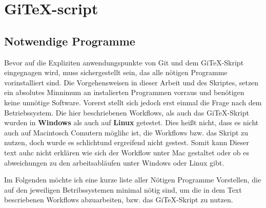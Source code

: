 \documentclass[12pt,a4paper]{scrartcl}
\begin{document}
\section{GiTeX-script}
\subsection{Notwendige Programme}
Bevor auf die Expliziten anwendungspunkte von Git und dem GiTeX-Skript eingegnagen wird, muss sichergestellt sein, das alle nötigen Programme vorinstalliert sind. Die Vorgehensweisen in dieser Arbeit und des Skriptes, setzen ein absolutes Minnimum an instalierten Programmen vorraus und benötigen keine unnötige Software. Vorerst stellt sich jedoch erst einmal die Frage nach dem Betriebssystem. Die hier beschriebenen Workflows, als auch das GiTeX-Skript wurden in \textbf{Windows} als auch auf \textbf{Linux} getestet. Dies heißt nicht, dass es nicht auch auf Macintosch Comutern möglihc ist, die Workflows bzw. das Skript zu nutzen, doch wurde es schlichtund ergreifend nicht gestest. Somit kann Dieser text auhc nicht erklären wie sich der Workflow unter Mac gestaltet oder ob es abweichungen zu den arbeitsabläufen unter Windows oder Linux gibt.

Im Folgenden möchte ich eine kurze liste aller Nötigen Programme Vorstellen, die auf den jeweiligen Betribssystemen minimal nötig sind, um die in dem Text bescriebenen Workflows abzuarbeiten, bzw. das GiTeX-Skript zu nutzen.
\end{document}
